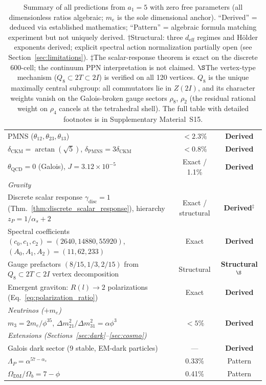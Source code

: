 \documentclass[12pt,a4paper]{article}
\theoremstyle{definition}
\begin{document}
\begin{table}[H]
\begin{tabular}{lcc}
PMNS ($\theta_{12}, \theta_{23}, \theta_{13}$) & $<2.3\%$ & \textbf{Derived} \\
$\delta_{\text{CKM}} = \arctan(\sqrt{5})$, $\delta_{\text{PMNS}} = 3\delta_{\text{CKM}}$ & $<0.8\%$ & \textbf{Derived} \\
$\theta_{\text{QCD}} = 0$ (Galois), $J = 3.12 \times 10^{-5}$ & Exact / 1.1\% & \textbf{Derived} \\
\midrule
\multicolumn{3}{l}{\textit{Gravity}} \\
Discrete scalar response $\gamma_{\mathrm{disc}} = 1$ (Thm.~\ref{thm:discrete_scalar_response}), hierarchy $z_P = 1/\alpha_s + 2$ & Exact / structural & \textbf{Derived}$^\ddagger$ \\
Spectral coefficients $(c_0,c_1,c_2) = (2640,14880,55920)$, $(A_0,A_1,A_2) = (11,62,233)$ & Exact & \textbf{Derived} \\
Gauge prefactors $(8/15,1/3,2/15)$ from $Q_8 \subset 2T \subset 2I$ vertex decomposition & Structural & \textbf{Structural}$^\S$ \\
Emergent graviton: $R(l) \to 2$ polarizations (Eq.~\ref{eq:polarization_ratio}) & Exact & \textbf{Derived} \\
\midrule
\multicolumn{3}{l}{\textit{Neutrinos ($+m_e$)}} \\
$m_3 = 2m_e/\phi^{35}$, $\Delta m^2_{21}/\Delta m^2_{31} = \alpha\phi^3$ & $<5\%$ & \textbf{Derived} \\
\midrule
\multicolumn{3}{l}{\textit{Extensions (Sections~\ref{sec:dark}--\ref{sec:cosmo})}} \\
Galois dark sector (9 stable, EM-dark particles) & --- & \textbf{Derived} \\
$\Lambda_P = \alpha^{57-\alpha_s}$ & 0.33\% & Pattern \\
$\Omega_{\text{DM}}/\Omega_b = 7 - \phi$ & 0.41\% & Pattern \\
\bottomrule
\end{tabular}
\caption[Summary of predictions.]{Summary of all predictions from $a_1 = 5$ with zero free parameters (all dimensionless ratios algebraic; $m_e$ is the sole dimensional anchor).  ``Derived'' = deduced via established mathematics; ``Pattern'' = algebraic formula matching experiment but not uniquely derived.  $\dagger$Structural: three $d_{\text{eff}}$ regimes and H\"{o}lder exponents derived; explicit spectral action normalization partially open (see Section~\ref{sec:limitations}).  $\ddagger$The scalar-response theorem is exact on the discrete 600-cell; the continuum PPN interpretation is not claimed.  $\S$The vertex-type mechanism ($Q_8 \subset 2T \subset 2I$) is verified on all 120 vertices.  $Q_8$ is the unique maximally central subgroup: all commutators lie in $Z(2I)$, and its character weights vanish on the Galois-broken gauge sectors $\rho_8$, $\rho_2$ (the residual rational weight on $\rho_4$ cancels at the tetrahedral shell).  The full table with detailed footnotes is in Supplementary Material~S15.}
\label{tab:summary}
\end{table}
\end{document}

